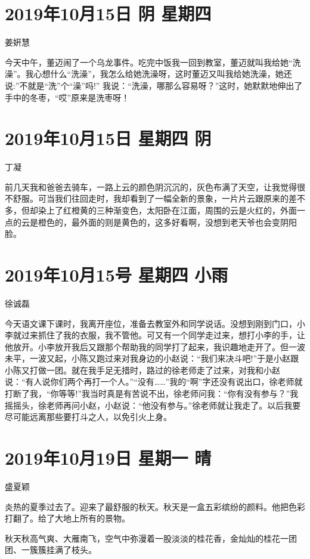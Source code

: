 \section{2019年10月15日 阴 星期四}

姜姸慧

今天中午，董迈闹了一个乌龙事件。吃完中饭我一回到教室，董迈就叫我给她``洗澡''。我心想什么``洗澡''，我怎么给她洗澡呀，这时董迈又叫我给她洗澡，她还说:''不就是``洗''个``澡''吗!''
我说：``洗澡，哪那么容易呀？''这时，她默默地伸出了手中的冬枣，``哎''原来是洗枣呀！

\section{2019年10月15日 星期四 阴}

丁凝

前几天我和爸爸去骑车，一路上云的颜色阴沉沉的，灰色布满了天空，让我觉得很不舒服。可当我们往回走时，我却看到了一幅全新的景象，一片片云跟原来的差不多，但却染上了红橙黄的三种渐变色，太阳卧在江面，周围的云是火红的，外面一点的云是橙色的，最外面的则是黄色的，这多好看啊，没想到老天爷也会变阴阳脸。

\section{2019年10月15号 星期四 小雨}

徐诚磊

今天语文课下课时，我离开座位，准备去教室外和同学说话。没想到刚到门口，小李就过来抓住了我的衣服，我不管他。可又有一个同学走过来，想打小李的手，让他放开。小李放开我后又跟那个帮助我的同学打了起来，我识趣地走开了。但一波未平，一波又起，小陈又跑过来对我身边的小赵说：``我们来决斗吧!''于是小赵跟小陈又打做一团。就在我手足无措时，路过的徐老师走了过来，对我和小赵说：``有人说你们两个再打一个人。''``没有\ldots\ldots{}''我的``啊''字还没有说出口，徐老师就打断了我，``你等等!''我当时真是有苦说不出，徐老师问我：``你有没有参与？''我摇摇头，徐老师再问小赵，小赵说：``他没有参与。''徐老师就让我走了。以后我要尽可能远离那些要打斗之人，以免引火上身。

\section{2019年10月19日 星期一 晴}

盛夏颖

炎热的夏季过去了。迎来了最舒服的秋天。秋天是一盒五彩缤纷的颜料。他把色彩打翻了。给了大地上所有的景物。

秋天秋高气爽、大雁南飞，空气中弥漫着一股淡淡的桂花香，金灿灿的桂花一团团、一簇簇挂满了枝头。

